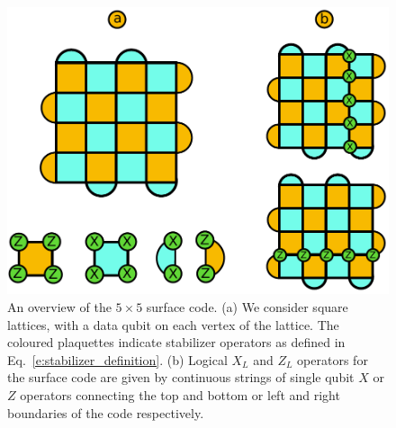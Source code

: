 \documentclass[twocolumn,preprintnumbers,amsmath,amssymb,notitlepage,nofootinbib,longbibliography,superscriptaddress,aps,pra,10pt]{revtex4-1}
\begin{document}
	\begin{figure}
		\centering
		\includegraphics[width=0.8\linewidth]{figures/surface_code.pdf}
		\caption{
			An overview of the $5 \times 5$ surface code.
			(a) We consider square lattices, with a data qubit on each vertex of the lattice.
			The coloured plaquettes indicate stabilizer operators as defined in Eq.~\eqref{e:stabilizer_definition}.
			(b) Logical $X_L$ and $Z_L$ operators for the surface code are given by continuous strings of single qubit $X$ or $Z$ operators connecting the top and bottom or left and right boundaries of the code respectively.
		}
		\label{f:surface_code}
	\end{figure}
\end{document}
